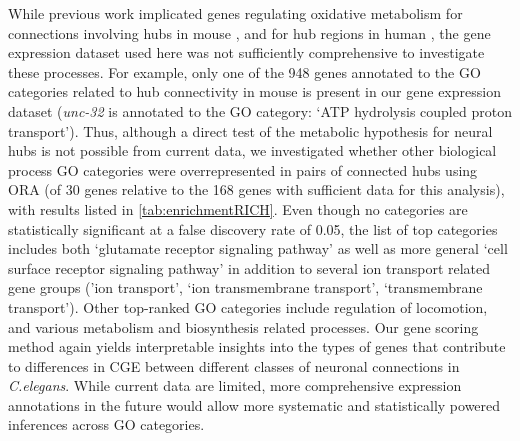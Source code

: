 {While previous work implicated genes regulating oxidative metabolism for connections involving hubs in mouse \citep{Fulcher2016}, and for hub regions in human \citep{Vertes2016b}, the gene expression dataset used here was not sufficiently comprehensive to investigate these processes.
For example, only one of the 948 genes annotated to the GO categories related to hub connectivity in mouse is present in our gene expression dataset (\emph{unc-32} is annotated to the GO category: `ATP hydrolysis coupled proton transport').
Thus, although a direct test of the metabolic hypothesis for neural hubs is not possible from current data, we investigated whether other biological process GO categories were overrepresented in pairs of connected hubs using ORA (of 30 genes relative to the 168 genes with sufficient data for this analysis), with results listed in \ref{tab:enrichmentRICH}.
Even though no categories are statistically significant at a false discovery rate of 0.05, the list of top categories includes both `glutamate receptor signaling pathway' as well as more general `cell surface receptor signaling pathway' in addition to several ion transport related gene groups ('ion transport', `ion transmembrane transport', `transmembrane transport').
Other top-ranked GO categories include regulation of locomotion, and various metabolism and biosynthesis related processes.
Our gene scoring method again yields interpretable insights into the types of genes that contribute to differences in CGE between different classes of neuronal connections in \emph{C.elegans}.
While current data are limited, more comprehensive expression annotations in the future would allow more systematic and statistically powered inferences across GO categories.

}
